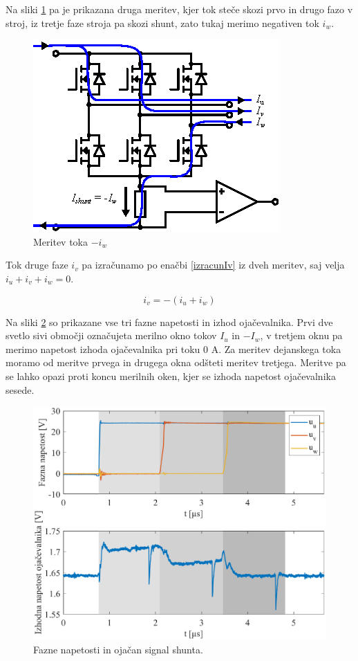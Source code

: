 \documentclass[a4paper,twoside,openright,12pt,slovene]{book}
\begin{document}
Na sliki \ref{meritevTokaIw} pa je prikazana druga meritev, kjer tok steče skozi prvo in drugo fazo v stroj, iz tretje faze stroja pa skozi shunt, zato tukaj merimo negativen tok $i_w$. 

\begin{figure}[!htbp]
    \centering
    \includegraphics[width=0.5\columnwidth]{Slike/Inkscape/meritevTokaIw.eps}
    \caption{\label{meritevTokaIw} Meritev toka $-i_w$ }
\end{figure}

Tok druge faze $i_v$ pa izračunamo po enačbi \ref{izracunIv} iz dveh meritev, saj velja $i_u + i_v + i_w = 0$.

\begin{equation} \label{izracunIv}
i_v = -(i_u + i_w)
\end{equation}

Na sliki \ref{fazeInShunt} so prikazane vse tri fazne napetosti in izhod ojačevalnika. Prvi dve svetlo sivi območji označujeta merilno okno tokov $I_u$ in $- I_w$, v tretjem oknu pa merimo napetost
izhoda ojačevalnika pri toku 0 A. Za meritev dejanskega toka moramo od meritve prvega in drugega okna odšteti meritev tretjega. Meritve pa se lahko opazi proti koncu merilnih oken, kjer se
izhoda napetost ojačevalnika sesede.

\begin{figure}[!htbp]
    \centering
    \includegraphics[width=1\columnwidth]{Slike/fazeInShunt.eps}
    \caption{\label{fazeInShunt} Fazne napetosti in ojačan signal shunta. }
\end{figure}
\end{document}
